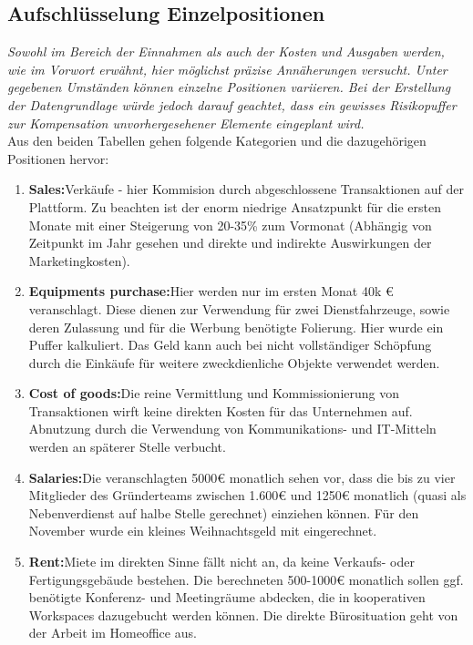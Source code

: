 \documentclass[11pt,a4paper]{report}
\begin{document}
\subsection{Aufschlüsselung Einzelpositionen}
\textit{Sowohl im Bereich der Einnahmen als auch der Kosten und Ausgaben werden, wie im Vorwort erwähnt, hier möglichst präzise Annäherungen versucht. Unter gegebenen Umständen können einzelne Positionen variieren. Bei der Erstellung der Datengrundlage würde jedoch darauf geachtet, dass ein gewisses Risikopuffer zur Kompensation unvorhergesehener Elemente eingeplant wird.}\\

Aus den beiden Tabellen gehen folgende Kategorien und die dazugehörigen Positionen hervor:
\begin{enumerate}
    \item \textbf{Sales:}\quad Verkäufe - hier Kommision durch abgeschlossene Transaktionen auf der Plattform. Zu beachten ist der enorm niedrige Ansatzpunkt für die ersten Monate mit einer Steigerung von 20-35\% zum Vormonat (Abhängig von Zeitpunkt im Jahr gesehen und direkte und indirekte Auswirkungen der Marketingkosten).
    \item \textbf{Equipments purchase:}\quad Hier werden nur im ersten Monat 40k € veranschlagt. Diese dienen zur Verwendung für zwei Dienstfahrzeuge, sowie deren Zulassung und für die Werbung benötigte Folierung. Hier wurde ein Puffer kalkuliert. Das Geld kann auch bei nicht vollständiger Schöpfung durch die Einkäufe für weitere zweckdienliche Objekte verwendet werden.
    \item \textbf{Cost of goods:}\quad Die reine Vermittlung und Kommissionierung von Transaktionen wirft keine direkten Kosten für das Unternehmen auf. Abnutzung durch die Verwendung von Kommunikations- und IT-Mitteln werden an späterer Stelle verbucht.
    \item \textbf{Salaries:}\quad Die veranschlagten 5000€ monatlich sehen vor, dass die bis zu vier Mitglieder des Gründerteams zwischen 1.600€ und 1250€ monatlich (quasi als Nebenverdienst auf halbe Stelle gerechnet) einziehen können. Für den November wurde ein kleines Weihnachtsgeld mit eingerechnet.
    \item \textbf{Rent:}\quad Miete im direkten Sinne fällt nicht an, da keine Verkaufs- oder Fertigungsgebäude bestehen. Die berechneten 500-1000€ monatlich sollen ggf. benötigte Konferenz- und Meetingräume abdecken, die in kooperativen Workspaces dazugebucht werden können. Die direkte Bürosituation geht von der Arbeit im Homeoffice aus. 

\end{enumerate}
\end{document}
